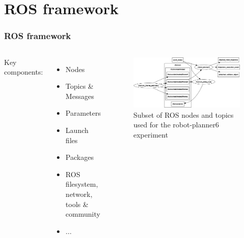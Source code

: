 \section{ROS framework}

\begin{frame}
\frametitle{ROS framework}
\begin{columns}
Key components:
\begin{itemize}
\item Nodes
\item Topics \& Messages
\item Parameters
\item Launch files
\item Packages
\item ROS filesystem, network, tools \& community
\item ...
\end{itemize}
\begin{center}
\begin{figure}[!htb]
\centering
\includegraphics[width=\textwidth]{../images/robot_planner6/topics-and-nodes.png}
\caption{Subset of ROS nodes and topics used for the robot-planner6 experiment}
\end{figure}
\end{center}
\end{columns}
\end{frame}

